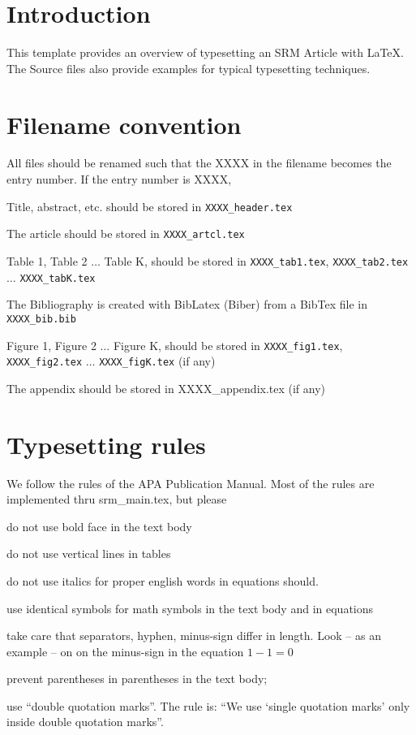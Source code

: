 \section{Introduction}

This template provides an overview of typesetting an SRM Article with
\LaTeX. The Source files also provide examples for typical typesetting
techniques.

\section{Filename convention}

All files should be renamed such that the XXXX in the filename becomes
the entry number. If the entry number is XXXX,

\bci
\item Title, abstract, etc. should be stored in  \texttt{XXXX\_header.tex}
\item The article should be stored in \texttt{XXXX\_artcl.tex}
\item Table 1, Table 2 $\ldots$ Table K, should be stored in
  \texttt{XXXX\_tab1.tex}, \texttt{XXXX\_tab2.tex} $\ldots$
  \texttt{XXXX\_tabK.tex} 
\item The Bibliography is created with BibLatex (Biber) from a BibTex
  file in \texttt{XXXX\_bib.bib}
\item Figure 1, Figure 2 $\ldots$ Figure K, should be stored in
  \texttt{XXXX\_fig1.tex}, \texttt{XXXX\_fig2.tex} $\ldots$
  \texttt{XXXX\_figK.tex} (if any)
\item The appendix should be stored in \textrm{XXXX\_appendix.tex} (if
  any) \eci

\section{Typesetting rules}

We follow the rules of the APA Publication Manual. Most of the rules
are implemented thru srm\_main.tex, but please


\bci
\item do not use bold face in the text body
\item do not use vertical lines in tables
\item do not use italics for proper english words in equations should.
\item use identical symbols for math symbols in the text body and in equations
\item take care that separators, hyphen, minus-sign differ in
  length. Look -- as an example -- on on the minus-sign in the equation $1-1=0$
\item prevent parentheses in parentheses in the text body; 
\item use ``double quotation marks''. The rule is: ``We use `single
  quotation marks' only inside  double quotation marks''.
\eci

